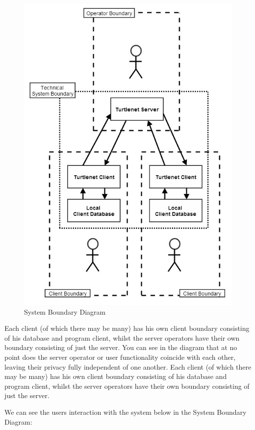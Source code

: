 \begin{figure}[h]
    \centering
    \includegraphics[width=\textwidth]{images/requirements/systemboundarydiagram.jpg}
    \caption{System Boundary Diagram}
    \label{fig:sbd_diag}
\end{figure}

Each client (of which there may be many) has his own client boundary consisting 
of his database and program client, whilst the server operators have their own 
boundary consisting of just the server. You can see in the diagram that at no 
point does the server operator or user functionality coincide with each other, 
leaving their privacy fully independent of one another. Each client (of which 
there may be many) has his own client boundary consisting of his database and 
program client, whilst the server operators have their own boundary consisting 
of just the server.

We can see the users interaction with the system below in the System Boundary 
Diagram:
